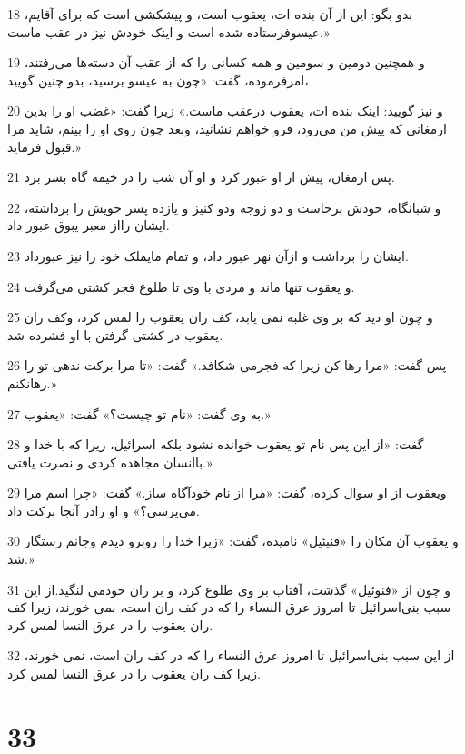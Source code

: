 \par 18 بدو بگو: این از آن بنده ات، یعقوب است، و پیشکشی است که برای آقایم، عیسوفرستاده شده است و اینک خودش نیز در عقب ماست.»
\par 19 و همچنین دومین و سومین و همه کسانی را که از عقب آن دسته‌ها می‌رفتند، امرفرموده، گفت: «چون به عیسو برسید، بدو چنین گویید،
\par 20 و نیز گویید: اینک بنده ات، یعقوب درعقب ماست.» زیرا گفت: «غضب او را بدین ارمغانی که پیش من می‌رود، فرو خواهم نشانید، وبعد چون روی او را بینم، شاید مرا قبول فرماید.»
\par 21 پس ارمغان، پیش از او عبور کرد و او آن شب را در خیمه گاه بسر برد.
\par 22 و شبانگاه، خودش برخاست و دو زوجه ودو کنیز و یازده پسر خویش را برداشته، ایشان رااز معبر یبوق عبور داد.
\par 23 ایشان را برداشت و ازآن نهر عبور داد، و تمام مایملک خود را نیز عبورداد.
\par 24 و یعقوب تنها ماند و مردی با وی تا طلوع فجر کشتی می‌گرفت.
\par 25 و چون او دید که بر وی غلبه نمی یابد، کف ران یعقوب را لمس کرد، وکف ران یعقوب در کشتی گرفتن با او فشرده شد.
\par 26 پس گفت: «مرا رها کن زیرا که فجرمی شکافد.» گفت: «تا مرا برکت ندهی تو را رهانکنم.»
\par 27 به وی گفت: «نام تو چیست؟» گفت: «یعقوب.»
\par 28 گفت: «از این پس نام تو یعقوب خوانده نشود بلکه اسرائیل، زیرا که با خدا و باانسان مجاهده کردی و نصرت یافتی.»
\par 29 ویعقوب از او سوال کرده، گفت: «مرا از نام خودآگاه ساز.» گفت: «چرا اسم مرا می‌پرسی؟» و او رادر آنجا برکت داد.
\par 30 و یعقوب آن مکان را «فنیئیل» نامیده، گفت: «زیرا خدا را روبرو دیدم وجانم رستگار شد.»
\par 31 و چون از «فنوئیل» گذشت، آفتاب بر وی طلوع کرد، و بر ران خودمی لنگید.از این سبب بنی‌اسرائیل تا امروز عرق النساء را که در کف ران است، نمی خورند، زیرا کف ران یعقوب را در عرق النسا لمس کرد.
\par 32 از این سبب بنی‌اسرائیل تا امروز عرق النساء را که در کف ران است، نمی خورند، زیرا کف ران یعقوب را در عرق النسا لمس کرد.
 
\chapter{33}

